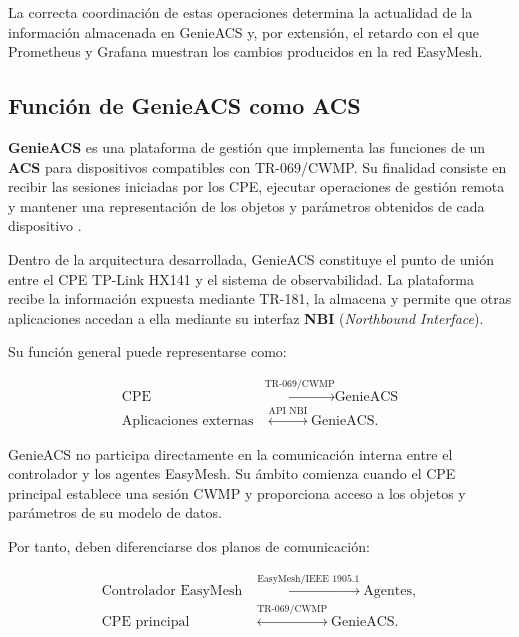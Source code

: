 La correcta coordinación de estas operaciones determina la actualidad de
la información almacenada en GenieACS y, por extensión, el retardo con el
que Prometheus y Grafana muestran los cambios producidos en la red
EasyMesh.

\subsection{Función de GenieACS como ACS}
\label{subsec:funcion-genieacs-acs}

\textbf{GenieACS} es una plataforma de gestión que implementa las
funciones de un \textbf{ACS} para dispositivos compatibles con
TR-069/CWMP. Su finalidad consiste en recibir las sesiones iniciadas por
los CPE, ejecutar operaciones de gestión remota y mantener una
representación de los objetos y parámetros obtenidos de cada dispositivo
\cite{genieacs_documentation,bbf_tr069}.

Dentro de la arquitectura desarrollada, GenieACS constituye el punto de
unión entre el CPE TP-Link HX141 y el sistema de observabilidad. La
plataforma recibe la información expuesta mediante TR-181, la almacena y
permite que otras aplicaciones accedan a ella mediante su interfaz
\textbf{NBI} (\textit{Northbound Interface}).

Su función general puede representarse como:

\[
\begin{aligned}
    \text{CPE}
    &\overset{\text{TR-069/CWMP}}{\longleftrightarrow}
    \text{GenieACS}\\
    \text{Aplicaciones externas}
    &\overset{\text{API NBI}}{\longleftrightarrow}
    \text{GenieACS}.
\end{aligned}
\]

GenieACS no participa directamente en la comunicación interna entre el
controlador y los agentes EasyMesh. Su ámbito comienza cuando el CPE
principal establece una sesión CWMP y proporciona acceso a los objetos y
parámetros de su modelo de datos.

Por tanto, deben diferenciarse dos planos de comunicación:

\[
\begin{aligned}
    \text{Controlador EasyMesh}
    &\overset{\text{EasyMesh/IEEE~1905.1}}{\longleftrightarrow}
    \text{Agentes},\\
    \text{CPE principal}
    &\overset{\text{TR-069/CWMP}}{\longleftrightarrow}
    \text{GenieACS}.
\end{aligned}
\]

